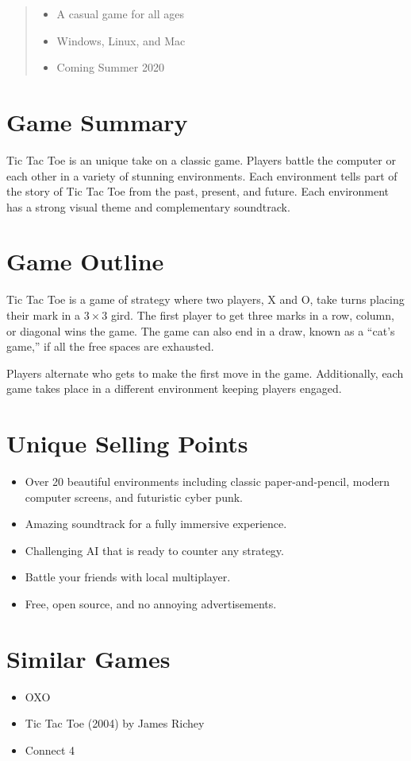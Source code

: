 \documentclass{tufte-handout}
\begin{document}
\begin{abstract}
  \begin{itemize}[noitemsep,label=]
    \item A casual game for all ages
    \item Windows, Linux, and Mac
    \item Coming Summer 2020
  \end{itemize}
\end{abstract}


\section{Game Summary}
Tic Tac Toe is an unique take on a classic game. Players battle the computer or
each other in a variety of stunning environments. Each environment tells part of
the story of Tic Tac Toe from the past, present, and future. Each environment
has a strong visual theme and complementary soundtrack.


\section{Game Outline}
Tic Tac Toe is a game of strategy where two players, X and O, take turns placing
their mark in a $3\times3$ gird. The first player to get three marks in a row,
column, or diagonal wins the game. The game can also end in a draw, known as a
``cat's game,'' if all the free spaces are exhausted.

Players alternate who gets to make the first move in the game. Additionally,
each game takes place in a different environment keeping players engaged.


\section{Unique Selling Points}
\begin{itemize}[noitemsep]
  \item {
    Over 20 beautiful environments including classic paper-and-pencil, modern
    computer screens, and futuristic cyber punk.
  }
  \item Amazing soundtrack for a fully immersive experience.
  \item Challenging AI that is ready to counter any strategy.
  \item Battle your friends with local multiplayer.
  \item Free, open source, and no annoying advertisements.
\end{itemize}


\section{Similar Games}
\begin{itemize}[noitemsep]
  \item OXO
  \item Tic Tac Toe (2004) by James Richey
  \item Connect 4
\end{itemize}
\end{document}

